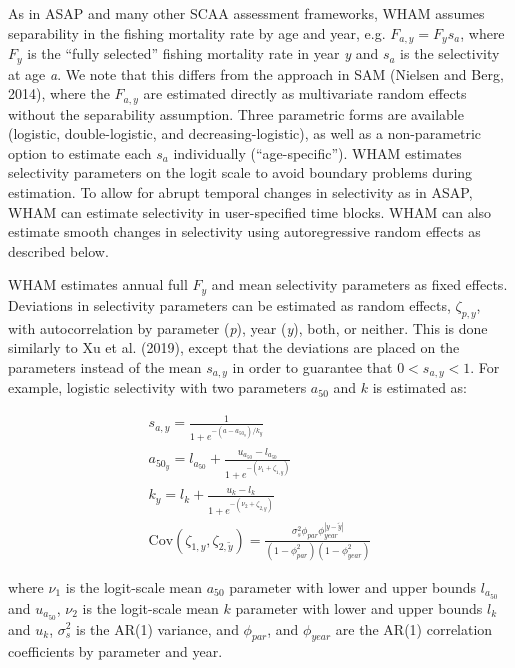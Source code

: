 \documentclass[]{article}
\begin{document}
As in ASAP and many other SCAA assessment frameworks, WHAM assumes
separability in the fishing mortality rate by age and year, e.g.
\(F_{a,y} = F_y s_a\), where \(F_y\) is the ``fully selected'' fishing
mortality rate in year \emph{y} and \(s_a\) is the selectivity at age
\emph{a}. We note that this differs from the approach in SAM (Nielsen
and Berg, 2014), where the \(F_{a,y}\) are estimated directly as
multivariate random effects without the separability assumption. Three
parametric forms are available (logistic, double-logistic, and
decreasing-logistic), as well as a non-parametric option to estimate
each \(s_a\) individually (``age-specific''). WHAM estimates selectivity
parameters on the logit scale to avoid boundary problems during
estimation. To allow for abrupt temporal changes in selectivity as in
ASAP, WHAM can estimate selectivity in user-specified time blocks. WHAM
can also estimate smooth changes in selectivity using autoregressive
random effects as described below.

WHAM estimates annual full \(F_y\) and mean selectivity parameters as
fixed effects. Deviations in selectivity parameters can be estimated as
random effects, \(\zeta_{p,y}\), with autocorrelation by parameter
(\emph{p}), year (\emph{y}), both, or neither. This is done similarly to
Xu et al. (2019), except that the deviations are placed on the
parameters instead of the mean \(s_{a,y}\) in order to guarantee that
\(0 < s_{a,y} < 1\). For example, logistic selectivity with two
parameters \(a_{50}\) and \(k\) is estimated as:

\begin{equation}
  \begin{array}{cccc}
    s_{a,y} = \frac{1}{1 + e^{-(a - a_{{50}_y}) / k_y}} \\
    a_{{50}_y} = l_{a_{50}} + \frac{u_{a_{50}} - l_{a_{50}}}{1 + e^{-(\nu_1 + \zeta_{1,y})}} \\
    k_y = l_k + \frac{u_k - l_k}{1 + e^{-(\nu_2 + \zeta_{2,y})}} \\
    \text{Cov} \left( \zeta_{1,y}, \zeta_{2,\tilde{y}} \right) = \frac{\sigma^2_s \phi_{par} \phi^{|y-\tilde{y}|}_{year}}{\left(1-\phi^2_{par}\right) \left(1-\phi^2_{year}\right)}
  \end{array}
\end{equation}

where \(\nu_1\) is the logit-scale mean \(a_{50}\) parameter with lower
and upper bounds \(l_{a_{50}}\) and \(u_{a_{50}}\), \(\nu_2\) is the
logit-scale mean \(k\) parameter with lower and upper bounds \(l_k\) and
\(u_k\), \(\sigma^2_s\) is the AR(1) variance, and \(\phi_{par}\), and
\(\phi_{year}\) are the AR(1) correlation coefficients by parameter and
year.
\end{document}
